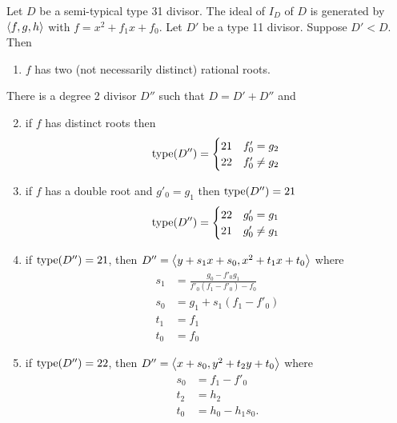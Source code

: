 \begin{proposition}
  Let $D$ be a semi-typical type 31 divisor.
  The ideal of $I_D$ of $D$ is generated by $\left\langle f,g,h \right\rangle$ with $f = x^2 + f_1x + f_0$.
  Let $D'$ be a type 11 divisor.
  Suppose $D' < D$. Then
  \begin{enumerate}[label=(\roman*)]
    \item $f$ has two (not necessarily distinct) rational roots.
  \end{enumerate}
  There is a degree 2 divisor $D''$ such that $D = D' + D''$ and
  \begin{enumerate}[label=(\roman*)]
    \setcounter{enumi}{1}
    \item if $f$ has distinct roots then
      \[ \operatorname{type}(D'') = \begin{cases} 21 & f'_0 = g_2 \\ 22 & f'_0 \neq g_2 \end{cases}\; \]
    \item if $f$ has a double root and $g'_0 = g_1$ then $\operatorname{type}(D'') = 21$
      \[ \operatorname{type}(D'') = \begin{cases} 22 & g'_0 = g_1 \\ 21 & g'_0 \neq g_1 \end{cases}\; \]
    \item if $\operatorname{type}(D'') = 21$, then $D'' = \left\langle y + s_1x + s_0, x^2 + t_1x + t_0 \right\rangle$ where
    \begin{align*}
      s_1 &= \frac{g_0 - f'_0g_1} {f'_0(f_1 - f'_0) - f_0} \\
      s_0 &= g_1 + s_1(f_1 - f'_0) \\
      t_1 &= f_1 \\
      t_0 &= f_0 \;
    \end{align*}
    \item if $\operatorname{type}(D'') = 22$, then $D'' = \left\langle x + s_0, y^2 + t_2y + t_0 \right\rangle$ where
    \begin{align*}
      s_0 &= f_1 - f'_0 \\
      t_2 &= h_2 \\
      t_0 &= h_0 - h_1s_0.
    \end{align*}
  \end{enumerate}
\end{proposition}
